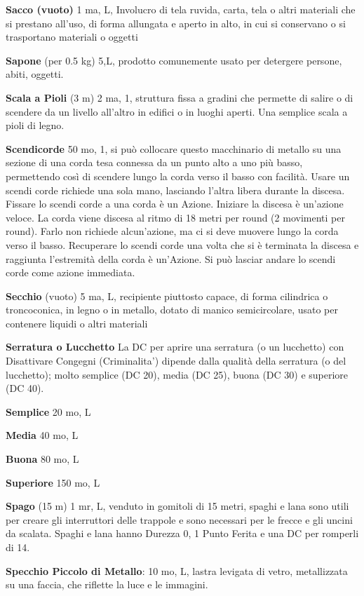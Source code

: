 \documentclass[a4paper,11pt,twoside,openany]{book}
\begin{document}
{\textbf{Sacco (vuoto)} 1 ma, L, Involucro di tela ruvida, carta, tela o altri materiali che si prestano all'uso, di forma allungata e aperto in alto, in cui si conservano o si trasportano materiali o oggetti

\textbf{Sapone} (per 0.5 kg) 5,L, prodotto comunemente usato per detergere persone, abiti, oggetti.

\textbf{Scala a Pioli} (3 m) 2 ma, 1, struttura fissa a gradini che permette di salire o di scendere da un livello all'altro in edifici o in luoghi aperti. Una semplice scala a pioli di legno.

\textbf{Scendicorde} 50 mo, 1, si può collocare questo macchinario di metallo su una sezione di una corda tesa connessa da un punto alto a uno più basso, permettendo così di scendere lungo la corda verso il basso con facilità. Usare un scendi corde richiede una sola mano, lasciando l'altra libera durante la discesa. Fissare lo scendi corde a una corda è un Azione. Iniziare la discesa è un'azione veloce. La corda viene discesa al ritmo di 18 metri per round (2 movimenti per round). Farlo non richiede alcun'azione, ma ci si deve muovere lungo la corda verso il basso. Recuperare lo scendi corde una volta che si è terminata la discesa e raggiunta l'estremità della corda è un'Azione.
Si può lasciar andare lo scendi corde come azione immediata.

\textbf{Secchio} (vuoto) 5 ma, L, recipiente piuttosto capace, di forma cilindrica o troncoconica, in legno o in metallo, dotato di manico semicircolare, usato per contenere liquidi o altri materiali

\textbf{Serratura o Lucchetto} La DC per aprire una serratura (o un lucchetto) con Disattivare Congegni (Criminalita') dipende dalla qualità della serratura (o del lucchetto); molto semplice (DC 20), media (DC 25), buona (DC 30) e superiore (DC 40).

\textbf{Semplice} 20 mo, L

\textbf{Media} 40 mo, L

\textbf{Buona} 80 mo, L

\textbf{Superiore} 150 mo, L

\textbf{Spago} (15 m) 1 mr, L, venduto in gomitoli di 15 metri, spaghi e lana sono utili per creare gli interruttori delle trappole e sono necessari per le frecce e gli uncini da scalata. Spaghi e lana hanno Durezza 0, 1 Punto Ferita e una DC per romperli di 14.

\textbf{Specchio Piccolo di Metallo}: 10 mo, L, lastra levigata di vetro, metallizzata su una faccia, che riflette la luce e le immagini.

}
\end{document}
